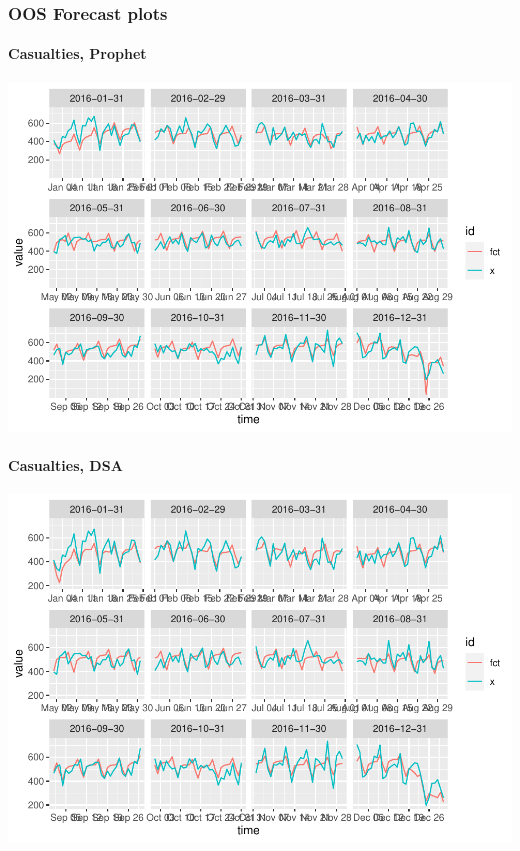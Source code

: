 \hypertarget{oos-forecast-plots}{%
\subsubsection{OOS Forecast plots}\label{oos-forecast-plots}}

\hypertarget{casualties-prophet-1}{%
\paragraph{Casualties, Prophet}\label{casualties-prophet-1}}

\begin{Schunk}

\includegraphics[width=1\linewidth]{overview_files/figure-latex/unnamed-chunk-8-1} \end{Schunk}

\hypertarget{casualties-dsa-1}{%
\paragraph{Casualties, DSA}\label{casualties-dsa-1}}

\begin{Schunk}

\includegraphics[width=1\linewidth]{overview_files/figure-latex/unnamed-chunk-9-1} \end{Schunk}

